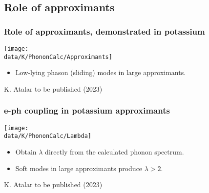 \subsection{Role of approximants}
\begin{frame}
\frametitle{Role of approximants, demonstrated in potassium}

\centerline{\texttt{[image: \\data/K/PhononCalc/Approximants]}}

\begin{itemize}
\item
Low-lying phason (sliding) modes in large approximants.
\end{itemize}

\vspace*{\fill}
\centerline{\makebox[\linewidth]{\rule{0.85\textwidth}{0.4pt}}}
\centerline{\scriptsize K. Atalar to be published (2023)}

\end{frame}

\begin{frame}
\frametitle{e-ph coupling in potassium approximants}

\centerline{\texttt{[image: \\data/K/PhononCalc/Lambda]}}

\begin{itemize}
\item
Obtain $\lambda$ directly from the calculated phonon spectrum.
\item
Soft modes in large approximants produce $\lambda > 2$.

\end{itemize}

\vspace*{\fill}

\centerline{\makebox[\linewidth]{\rule{0.85\textwidth}{0.4pt}}}
\centerline{\scriptsize K. Atalar to be published (2023)}

\end{frame}



